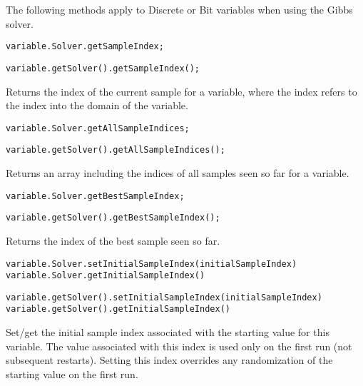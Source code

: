 
The following methods apply to Discrete or Bit variables when using the Gibbs solver.

\ifmatlab
\begin{lstlisting}
variable.Solver.getSampleIndex;
\end{lstlisting}
\fi

\ifjava
\begin{lstlisting}
variable.getSolver().getSampleIndex();
\end{lstlisting}
\fi

Returns the index of the current sample for a variable, where the index refers to the index into the domain of the variable.

\ifmatlab
\begin{lstlisting}
variable.Solver.getAllSampleIndices;
\end{lstlisting}
\fi

\ifjava
\begin{lstlisting}
variable.getSolver().getAllSampleIndices();
\end{lstlisting}
\fi

Returns an array including the indices of all samples seen so far for a variable.

\ifmatlab
\begin{lstlisting}
variable.Solver.getBestSampleIndex;
\end{lstlisting}
\fi

\ifjava
\begin{lstlisting}
variable.getSolver().getBestSampleIndex();
\end{lstlisting}
\fi

Returns the index of the best sample seen so far.


\ifmatlab
\begin{lstlisting}
variable.Solver.setInitialSampleIndex(initialSampleIndex)
variable.Solver.getInitialSampleIndex()
\end{lstlisting}
\fi

\ifjava
\begin{lstlisting}
variable.getSolver().setInitialSampleIndex(initialSampleIndex)
variable.getSolver().getInitialSampleIndex()
\end{lstlisting}
\fi

Set/get the initial sample index associated with the starting value for this variable.  The value associated with this index is used only on the first run (not subsequent restarts).  Setting this index overrides any randomization of the starting value on the first run.


